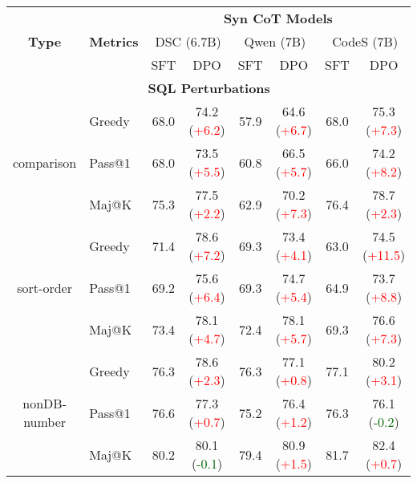 \begin{table*}[t!]
    \centering
\begin{adjustbox}{max width=\textwidth}
    \begin{tabular}{c | l | c c | c c | c c }
        \toprule
         \multirow{3}{*}{\textbf{Type}} & \multirow{3}{*}{\textbf{Metrics}} & \multicolumn{6}{c}{\textbf{Syn CoT Models}} \\ \cline{3-8}
         & & \multicolumn{2}{c}{DSC (6.7B)} & \multicolumn{2}{c}{Qwen (7B)} & \multicolumn{2}{c}{CodeS (7B)} \\ \cline{3-8}
         & & SFT & DPO & SFT & DPO & SFT & DPO \\ \midrule
        \multicolumn{8}{c}{\textbf{SQL Perturbations}} \\ \midrule

        \multirow{3}{*}{comparison} & Greedy & 68.0 & 74.2 (\textcolor{red}{+6.2}) & 57.9 & 64.6 (\textcolor{red}{+6.7}) & 68.0 & 75.3 (\textcolor{red}{+7.3}) \\
& Pass@1 & 68.0 & 73.5 (\textcolor{red}{+5.5}) & 60.8 & 66.5 (\textcolor{red}{+5.7}) & 66.0 & 74.2 (\textcolor{red}{+8.2}) \\
& Maj@K & 75.3 & 77.5 (\textcolor{red}{+2.2}) & 62.9 & 70.2 (\textcolor{red}{+7.3}) & 76.4 & 78.7 (\textcolor{red}{+2.3}) \\
 \midrule

        \multirow{3}{*}{sort-order} & Greedy & 71.4 & 78.6 (\textcolor{red}{+7.2}) & 69.3 & 73.4 (\textcolor{red}{+4.1}) & 63.0 & 74.5 (\textcolor{red}{+11.5}) \\
& Pass@1 & 69.2 & 75.6 (\textcolor{red}{+6.4}) & 69.3 & 74.7 (\textcolor{red}{+5.4}) & 64.9 & 73.7 (\textcolor{red}{+8.8}) \\
& Maj@K & 73.4 & 78.1 (\textcolor{red}{+4.7}) & 72.4 & 78.1 (\textcolor{red}{+5.7}) & 69.3 & 76.6 (\textcolor{red}{+7.3}) \\
 \midrule

        \multirow{3}{*}{nonDB-number} & Greedy & 76.3 & 78.6 (\textcolor{red}{+2.3}) & 76.3 & 77.1 (\textcolor{red}{+0.8}) & 77.1 & 80.2 (\textcolor{red}{+3.1}) \\
& Pass@1 & 76.6 & 77.3 (\textcolor{red}{+0.7}) & 75.2 & 76.4 (\textcolor{red}{+1.2}) & 76.3 & 76.1 (\textcolor{darkgreen}{-0.2}) \\
& Maj@K & 80.2 & 80.1 (\textcolor{darkgreen}{-0.1}) & 79.4 & 80.9 (\textcolor{red}{+1.5}) & 81.7 & 82.4 (\textcolor{red}{+0.7}) \\
 \midrule
        

\end{tabular}
\end{adjustbox}
\end{table*}
